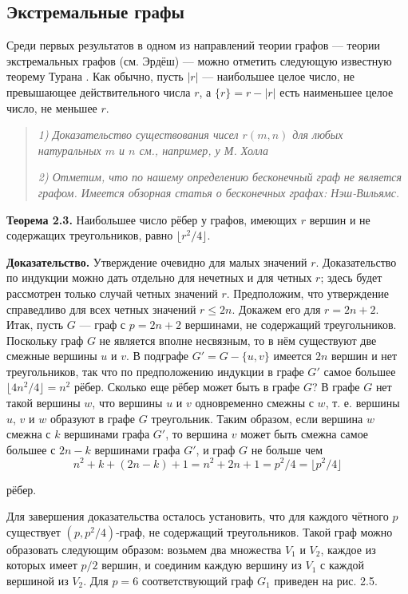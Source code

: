 \subsection{Экстремальные графы}

Среди первых результатов в одном из направлений теории графов — теории экстремальных графов (см. Эрдёш) — можно отметить следующую известную теорему Турана . Как обычно, пусть \(|r|\) — наибольшее целое число, не превышающее действительного числа \(r\), а \(\{r\} = r - |r|\) есть наименьшее целое число, не меньшее \(r\).

\begin{quote}
    \textit{1) Доказательство существования чисел \(r(m, n)\) для любых натуральных \(m\) и \(n\) см., например, у М. Холла}

    \textit{2) Отметим, что по нашему определению бесконечный граф не является графом. Имеется обзорная статья о бесконечных графах: Нэш-Вильямс.}
\end{quote}

    \textbf{Теорема 2.3.} Наибольшее число рёбер у графов, имеющих \(r\) вершин и не содержащих треугольников, равно \(\lfloor r^2/4 \rfloor\).

\textbf{Доказательство.} Утверждение очевидно для малых значений \(r\). Доказательство по индукции можно дать отдельно для нечетных и для четных \(r\); здесь будет рассмотрен только случай четных значений \(r\). Предположим, что утверждение справедливо для всех четных значений \(r \leq 2n\). Докажем его для \(r = 2n + 2\). Итак, пусть \(G\) — граф с \(p = 2n + 2\) вершинами, не содержащий треугольников. Поскольку граф \(G\) не является вполне несвязным, то в нём существуют две смежные вершины \(u\) и \(v\). В подграфе \(G' = G - \{u, v\}\) имеется \(2n\) вершин и нет треугольников, так что по предположению индукции в графе \(G'\) самое большее \(\lfloor 4n^2/4 \rfloor = n^2\) рёбер. Сколько еще рёбер может быть в графе \(G\)? В графе \(G\) нет такой вершины \(w\), что вершины \(u\) и \(v\) одновременно смежны с \(w\), т. е. вершины \(u\), \(v\) и \(w\) образуют в графе \(G\) треугольник. Таким образом, если вершина \(w\) смежна с \(k\) вершинами графа \(G'\), то вершина \(v\) может быть смежна самое большее с \(2n - k\) вершинами графа \(G'\), и граф \(G\) не больше чем \[
n^2 + k + (2n - k) + 1 = n^2 + 2n + 1 = p^2/4 = \lfloor p^2/4 \rfloor
\]

рёбер.

Для завершения доказательства осталось установить, что для каждого чётного \(p\) существует \((p, p^2/4)\)-граф, не содержащий треугольников. Такой граф можно образовать следующим образом: возьмем два множества \(V_1\) и \(V_2\), каждое из которых имеет \(p/2\) вершин, и соединим каждую вершину из \(V_1\) с каждой вершиной из \(V_2\). Для \(p = 6\) соответствующий граф \(G_1\) приведен на рис. 2.5.


